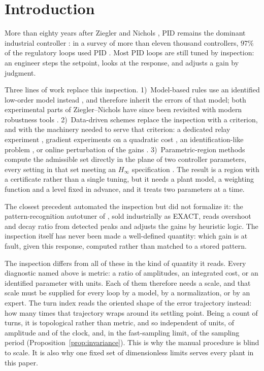 \documentclass[final,3p,times,twocolumn]{elsarticle}
\newcommand{\fix}[1]{#1}  %
\begin{document}
\section{Introduction}

More than eighty years after Ziegler and Nichols \cite{ZN1942}, PID
remains the dominant industrial controller
\cite{AstromHagglund2001}: in a survey of more than eleven thousand
controllers, $97\%$ of the regulatory loops used PID
\cite{Desborough2002}. Most PID
loops are still tuned by inspection: an engineer steps the setpoint,
looks at the response, and adjusts a gain by judgment.

Three lines of work replace this inspection.
1)~Model-based rules use an identified low-order model instead
\cite{ZN1942,CohenCoon1953,RiveraIMC,Skogestad2003}, and therefore
inherit the errors of that model; both experimental parts of
Ziegler--Nichols have since been revisited with modern robustness tools
\cite{AstromHagglund2004,Schlegel2002,SchlegelCech2005}.
2)~Data-driven schemes replace the inspection with a criterion, and
with the machinery needed to serve that criterion: a dedicated relay
experiment \cite{AstromHagglund1984}, gradient experiments on a
quadratic cost \cite{HjalmarssonIFT}, an identification-like problem
\cite{CampiVRFT}, or online perturbation of the gains
\cite{KillingsworthKrstic}.
\fix{3)~Parametric-region methods compute the admissible set directly
in the plane of two controller parameters, every setting in that set
meeting an $H_\infty$ specification
\cite{BrabecSchlegel2023,Ho2003}. The result is a region with a
certificate rather than a single tuning, but it needs a plant model, a
weighting function and a level fixed in advance, and it treats two
parameters at a time.}

The closest precedent automated the inspection but did not formalize
it: the pattern-recognition autotuner of \cite{KrausMyron1984}, sold
industrially as EXACT, reads overshoot and decay ratio from detected
peaks and adjusts the gains by heuristic logic. The inspection itself
has never been made a well-defined quantity: which gain is at fault,
given this response, computed rather than matched to a stored
pattern.

The inspection differs from all of these in the kind of quantity it
reads. Every diagnostic named above is metric: a ratio of amplitudes,
an integrated cost, or an identified parameter with units. Each of them
therefore needs a scale, and that scale must be supplied for every loop
by a model, by a normalization, or by an expert. The turn index reads the oriented shape of the error trajectory
instead: how many times that trajectory wraps around its settling point.
Being a count of turns, it is topological rather than metric, and so
independent of units, of amplitude and of the clock, and, in the fast-sampling limit, of the sampling period
(Proposition~\ref{prop:invariance}). This is why the manual procedure
is blind to scale. It is also why one fixed set of dimensionless
limits serves every plant in this paper.
\end{document}
